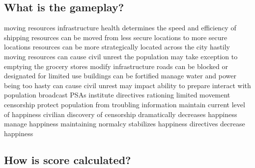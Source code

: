 \documentclass{article}
\begin{document}
\subsection{What is the gameplay?}

\begin{outline}[enumerate]
  \1 moving resources
    \2 infrastructure health determines the speed and efficiency of shipping
    \2 resources can be moved from less secure locations to more secure locations
    \2 resources can be more strategically located across the city
    \2 hastily moving resources can cause civil unrest
      \3 the population may take exception to emptying the grocery stores
  \1 modify infrastructure
    \2 roads can be blocked or designated for limited use
    \2 buildings can be fortified
    \2 manage water and power
      \3 being too hasty can cause civil unrest
      \3 may impact ability to prepare
  \1 interact with population
    \2 broadcast PSAs
    \2 institute directives
      \3 rationing
      \3 limited movement
    \2 censorship
      \3 protect population from troubling information
        \4 maintain current level of happiness
      \3 civilian discovery of censorship dramatically decreases happiness
    \2 manage happiness
      \3 maintaining normalcy stabilizes happiness
      \3 directives decrease happiness
      
\end{outline}

\subsection{How is score calculated?}
\end{document}
